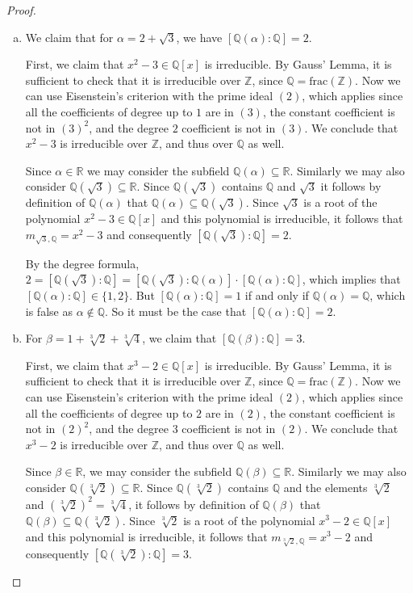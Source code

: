 \documentclass[11pt]{article}
\newcommand{\Q}{\mathbb{Q}}
\newcommand{\Z}{\mathbb{Z}}
\newcommand{\R}{\mathbb{R}}
\theoremstyle{definition}
\begin{document}
\begin{proof}
\begin{enumerate}[a)]
\item We claim that for $\alpha = 2 + \sqrt{3} $, we have $[\Q(\alpha) : \Q]=2$.


First, we claim that $x^2-3 \in \Q[x]$ is irreducible. By Gauss' Lemma, it is sufficient to check that it is irreducible over $\Z$, since $\Q = \textrm{frac}(\Z)$. Now we can use Eisenstein's criterion with the prime ideal $(2)$, which applies since all the coefficients of degree up to $1$ are in $(3)$, the constant coefficient is not in $(3)^2$, and the degree $2$ coefficient is not in $(3)$. We conclude that $x^2-3$ is irreducible over $\Z$, and thus over $\Q$ as well.


Since $\alpha \in \R$ we may consider the subfield $\Q(\alpha) \subseteq \R$. Similarly we may also consider $\Q( \sqrt{3} )\subseteq \R$. Since $\Q(\sqrt{3})$ contains $\Q$ and $\sqrt{3}$ it follows by definition of $\Q(\alpha)$ that $\Q(\alpha)\subseteq \Q(\sqrt{3})$. Since $ \sqrt{3}$ is a root of the polynomial $x^2-3\in\Q[x]$  and this polynomial is irreducible, it follows that $m_{ \sqrt{3},\Q}=x^2-3$ and consequently $[\Q(\sqrt{3}):\Q]=2$.

By the degree formula, $2=[\Q(\sqrt{3}):\Q]=[\Q(\sqrt{3}):\Q(\alpha)]\cdot[\Q(\alpha):\Q]$, which implies that $[\Q(\alpha):\Q]\in \{1,2\}$. But $[\Q(\alpha):\Q]=1$ if and only if $\Q(\alpha)=\Q$, which is false as $\alpha \notin \Q$. So it must be the case that $[\Q(\alpha):\Q]=2$.

\item For $\beta = 1 + \sqrt[3]{2}+\sqrt[3]{4}$, we claim that $[\Q(\beta) : \Q]=3$.


First, we claim that $x^3-2 \in \Q[x]$ is irreducible. By Gauss' Lemma, it is sufficient to check that it is irreducible over $\Z$, since $\Q = \textrm{frac}(\Z)$. Now we can use Eisenstein's criterion with the prime ideal $(2)$, which applies since all the coefficients of degree up to $2$ are in $(2)$, the constant coefficient is not in $(2)^2$, and the degree $3$ coefficient is not in $(2)$. We conclude that $x^3-2$ is irreducible over $\Z$, and thus over $\Q$ as well.


Since $\beta \in \R$, we may consider the subfield $\Q(\beta) \subseteq \R$. Similarly we may also consider $\Q( \sqrt[3]{2} )\subseteq \R$. Since $\Q(\sqrt[3]{2})$ contains $\Q$ and the elements $\sqrt[3]{2}$ and $(\sqrt[3]{2})^2= \sqrt[3]{4}$, it follows by definition of $\Q(\beta)$ that $\Q(\beta)\subseteq \Q(\sqrt[3]{2})$. Since $\sqrt[3]{2}$ is a root of the polynomial $x^3-2 \in \Q[x]$  and this polynomial is irreducible, it follows that $m_{ \sqrt[3]{2},\Q}=x^3-2$ and consequently $[\Q(\sqrt[3]{2}):\Q]=3$.


\end{enumerate}
\end{proof}
\end{document}
